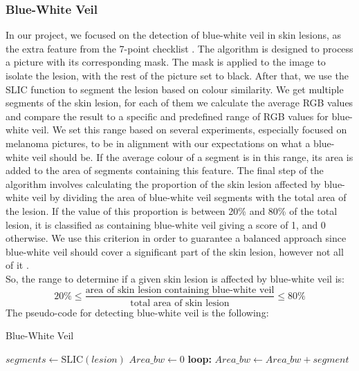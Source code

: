 \subsubsection{Blue-White Veil}
In our project, we focused on the detection of blue-white veil in skin lesions, as the extra feature from the 7-point checklist \cite{seven-pointchecklist}.
\newline
The algorithm is designed to process a picture with its corresponding mask. The mask is applied to the image to isolate the lesion, with the rest of the picture set to black.
\newline
After that, we use the SLIC function to segment the lesion based on colour similarity. We get multiple segments of the skin lesion, for each of them we calculate the average RGB values and compare the result to a specific and predefined range of RGB values for blue-white veil. We set this range based on several experiments, especially focused on melanoma pictures, to be in alignment with our expectations on what a blue-white veil should be. If the average colour of a segment is in this range, its area is added to the area of segments containing this feature.
\newline
The final step of the algorithm involves calculating the proportion of the skin lesion affected by blue-white veil by dividing the area of blue-white veil segments with the total area of the lesion. If the value of this proportion is between 20\% and 80\% of the total lesion, it is classified as containing blue-white veil giving a score of 1, and 0 otherwise. We use this criterion in order to guarantee a balanced approach since blue-white veil should cover a significant part of the skin lesion, however not all of it \cite{seven-pointchecklist}.\\
So, the range to determine if a given skin lesion is affected by blue-white veil is: \[20\%\le\frac{\text{area of skin lesion containing blue-white veil}}{\text{total area of skin lesion}}\le80\%\]
\newpage
\noindent The pseudo-code for detecting blue-white veil is the following:

\begin{algorithm}[H]
\caption{Blue-White Veil}
\begin{algorithmic}[1]
\State $segments \gets \text{SLIC}(lesion)$
\State $Area\_bw \gets 0$
\BState \textbf{loop:}
        \State $Area\_bw \gets Area\_bw + segment$
    \EndIf
\EndFor
{}
    \State {}
\Else
    \State {}
\EndIf
\end{algorithmic}
\end{algorithm}

